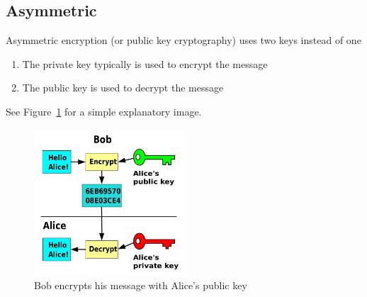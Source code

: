\subsection{Asymmetric}
Asymmetric encryption (or public key cryptography) uses two keys instead of one

\begin{enumerate}
    \item The private key typically is used to encrypt the message
    \item The public key is used to decrypt the message
\end{enumerate}
See Figure~\ref{fig:public_key} for a simple explanatory image.

\begin{figure}
    \center{}
    \includegraphics[width=0.5\textwidth]{public_key}
    \caption{Bob encrypts his message with Alice's public
    key}\label{fig:public_key}
\end{figure}

